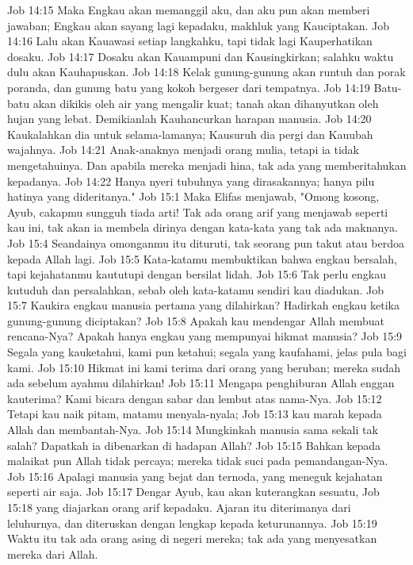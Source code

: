 Job 14:15  Maka Engkau akan memanggil aku, dan aku pun akan memberi jawaban; Engkau akan sayang lagi kepadaku, makhluk yang Kauciptakan.
Job 14:16  Lalu akan Kauawasi setiap langkahku, tapi tidak lagi Kauperhatikan dosaku.
Job 14:17  Dosaku akan Kauampuni dan Kausingkirkan; salahku waktu dulu akan Kauhapuskan.
Job 14:18  Kelak gunung-gunung akan runtuh dan porak poranda, dan gunung batu yang kokoh bergeser dari tempatnya.
Job 14:19  Batu-batu akan dikikis oleh air yang mengalir kuat; tanah akan dihanyutkan oleh hujan yang lebat. Demikianlah Kauhancurkan harapan manusia.
Job 14:20  Kaukalahkan dia untuk selama-lamanya; Kausuruh dia pergi dan Kauubah wajahnya.
Job 14:21  Anak-anaknya menjadi orang mulia, tetapi ia tidak mengetahuinya. Dan apabila mereka menjadi hina, tak ada yang memberitahukan kepadanya.
Job 14:22  Hanya nyeri tubuhnya yang dirasakannya; hanya pilu hatinya yang dideritanya."
Job 15:1  Maka Elifas menjawab, "Omong kosong, Ayub, cakapmu sungguh tiada arti! Tak ada orang arif yang menjawab seperti kau ini, tak akan ia membela dirinya dengan kata-kata yang tak ada maknanya.
Job 15:4  Seandainya omonganmu itu dituruti, tak seorang pun takut atau berdoa kepada Allah lagi.
Job 15:5  Kata-katamu membuktikan bahwa engkau bersalah, tapi kejahatanmu kaututupi dengan bersilat lidah.
Job 15:6  Tak perlu engkau kutuduh dan persalahkan, sebab oleh kata-katamu sendiri kau diadukan.
Job 15:7  Kaukira engkau manusia pertama yang dilahirkan? Hadirkah engkau ketika gunung-gunung diciptakan?
Job 15:8  Apakah kau mendengar Allah membuat rencana-Nya? Apakah hanya engkau yang mempunyai hikmat manusia?
Job 15:9  Segala yang kauketahui, kami pun ketahui; segala yang kaufahami, jelas pula bagi kami.
Job 15:10  Hikmat ini kami terima dari orang yang beruban; mereka sudah ada sebelum ayahmu dilahirkan!
Job 15:11  Mengapa penghiburan Allah enggan kauterima? Kami bicara dengan sabar dan lembut atas nama-Nya.
Job 15:12  Tetapi kau naik pitam, matamu menyala-nyala;
Job 15:13  kau marah kepada Allah dan membantah-Nya.
Job 15:14  Mungkinkah manusia sama sekali tak salah? Dapatkah ia dibenarkan di hadapan Allah?
Job 15:15  Bahkan kepada malaikat pun Allah tidak percaya; mereka tidak suci pada pemandangan-Nya.
Job 15:16  Apalagi manusia yang bejat dan ternoda, yang meneguk kejahatan seperti air saja.
Job 15:17  Dengar Ayub, kau akan kuterangkan sesuatu,
Job 15:18  yang diajarkan orang arif kepadaku. Ajaran itu diterimanya dari leluhurnya, dan diteruskan dengan lengkap kepada keturunannya.
Job 15:19  Waktu itu tak ada orang asing di negeri mereka; tak ada yang menyesatkan mereka dari Allah.
